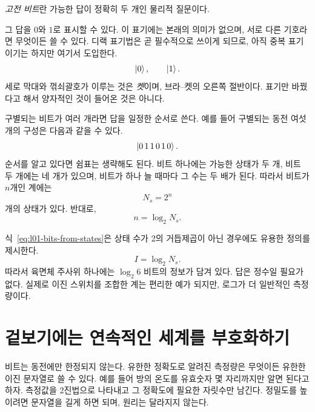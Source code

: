 \begin{definition}
\emph{고전 비트}란 가능한 답이 정확히 두 개인 물리적 질문이다.
\end{definition}

그 답을 \(0\)와 \(1\)로 표시할 수 있다. 이 표기에는 본래의 의미가 없으며, 서로 다른 기호라면 무엇이든 쓸 수 있다. 디랙 표기법은 곧 필수적으로 쓰이게 되므로, 아직 중복 표기이기는 하지만 여기서 도입한다.
\begin{equation}
  \left\lvert0\right\rangle,
  \qquad
  \left\lvert1\right\rangle.
\end{equation}
세로 막대와 꺾쇠괄호가 이루는 것은 \emph{켓}이며, 브라--켓의 오른쪽 절반이다. 표기만 바꿨다고 해서 양자적인 것이 들어온 것은 아니다.

구별되는 비트가 여러 개라면 답을 일정한 순서로 쓴다. 예를 들어 구별되는 동전 여섯 개의 구성은 다음과 같을 수 있다.
\begin{equation}
  \left\lvert0\,1\,1\,0\,1\,0\right\rangle.
\end{equation}
순서를 알고 있다면 쉼표는 생략해도 된다. 비트 하나에는 가능한 상태가 두 개, 비트 두 개에는 네 개가 있으며, 비트가 하나 늘 때마다 그 수는 두 배가 된다. 따라서 비트가 \(n\)개인 계에는
\begin{equation}
  N_s=2^n
  \label{eq:l01-state-count}
\end{equation}
개의 상태가 있다. 반대로,
\begin{equation}
  n=\log_2 N_s.
  \label{eq:l01-bits-from-states}
\end{equation}

식~\eqref{eq:l01-bits-from-states}은 상태 수가 2의 거듭제곱이 아닌 경우에도 유용한 정의를 제시한다.
\begin{equation}
  I=\log_2 N_s.
  \label{eq:l01-information}
\end{equation}
따라서 육면체 주사위 하나에는 \(\log_2 6\) 비트의 정보가 담겨 있다. 답은 정수일 필요가 없다. 실제로 이진 스위치를 조합한 계는 편리한 예가 되지만, 로그가 더 일반적인 측정량이다.

\section{겉보기에는 연속적인 세계를 부호화하기}

비트는 동전에만 한정되지 않는다. 유한한 정확도로 알려진 측정량은 무엇이든 유한한 이진 문자열로 쓸 수 있다. 예를 들어 방의 온도를 유효숫자 몇 자리까지만 알면 된다고 하자. 측정값을 2진법으로 나타내고 그 정확도에 필요한 자릿수만 남긴다. 정밀도를 높이려면 문자열을 길게 하면 되며, 원리는 달라지지 않는다.

